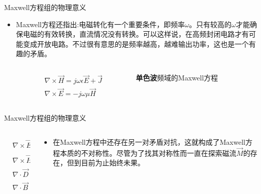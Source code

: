 \begin{frame}{Maxwell方程组的物理意义}
 \begin{itemize}
  \item Maxwell方程还指出:电磁转化有一个重要条件，即频率$\omega$。只有较高的$\omega$才能确保电磁的有效转换，直流情况没有转换。可以这样说，在高频封闭电路才有可能变成开放电路。不过很有意思的是频率越高，越难输出功率，这也是一个有趣的矛盾。
        \begin{columns}
         \begin{column}{0.4\linewidth}
          \begin{align*}
            & \nabla\times\vec{H} = j\omega\epsilon\vec{E}+\vec{J} \\
            & \nabla\times\vec{E} = -j\omega\mu\vec{H}
          \end{align*}
         \end{column}
         \begin{column}{0.6\linewidth}
          \textbf{单色波}频域的Maxwell方程
         \end{column}
        \end{columns}
 \end{itemize}
\end{frame}

\begin{frame}{Maxwell方程组的物理意义}
 \begin{columns}
  \begin{column}{0.4\linewidth}
   \begin{align*}
     & \nabla\times\vec E=-\frac{\partial \vec B}{\partial t}         \\
     & \nabla\times\vec H=\vec{J} +\frac{\partial \vec D}{\partial t} \\
     & \nabla\cdot\vec{D}=\rho                                        \\
     & \nabla\cdot\vec{B}=0
   \end{align*}
  \end{column}
  \begin{column}{0.65\linewidth}
   \begin{itemize}
    \item 在Maxwell方程中还存在另一对矛盾对抗，这就构成了Maxwell方程本质的不对称性。尽管为了找其对称性而一直在探索磁流$\vec{M}$的存在，但到目前为止始终未果。
   \end{itemize}
  \end{column}
 \end{columns}
\end{frame}

